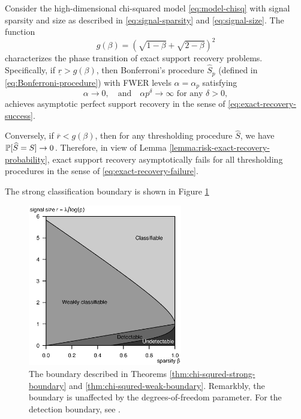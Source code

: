 \begin{theorem} \label{thm:chi-squred-strong-boundary}
Consider the high-dimensional chi-squared model \eqref{eq:model-chisq} with signal sparsity and size as described in \eqref{eq:signal-sparsity} and \eqref{eq:signal-size}.
The function 
\begin{equation} \label{eq:strong-classification-boundary-chisquared}
    g(\beta) = \left(\sqrt{1-\beta} + \sqrt{2-\beta}\right)^2
\end{equation}
characterizes the phase transition of exact support recovery problems.
Specifically, if $\underline{r} > {{g}}(\beta)$, then Bonferroni's procedure $\widehat{S}_p$ (defined in \eqref{eq:Bonferroni-procedure}) with FWER levels $\alpha=\alpha_p$ satisfying
\begin{equation} \label{eq:FWER-rate-to-zero}
    \alpha\to 0,\quad \text{and} \quad \alpha p^\delta\to\infty \text{  for any } \delta>0,
\end{equation}
achieves asymptotic perfect support recovery in the sense of \eqref{eq:exact-recovery-success}. 

Conversely, if $\overline{r} < {{g}}(\beta)$, then for any thresholding procedure $\widehat{S}$, we have $\P[\widehat{S}=S]\to0$.
Therefore, in view of Lemma \ref{lemma:risk-exact-recovery-probability}, exact support recovery asymptotically fails for all thresholding procedures in the sense of \eqref{eq:exact-recovery-failure}.
\end{theorem}

The strong classification boundary is shown in Figure \ref{fig:phase-chi-squared}

\begin{figure}
      \centering
      \includegraphics[width=0.6\textwidth]{./phase_diagram_chisquared.eps}
      \caption{The boundary described in Theorems \ref{thm:chi-squred-strong-boundary} and \ref{thm:chi-squred-weak-boundary}. 
      Remarkbly, the boundary is unaffected by the degrees-of-freedom parameter.
      For the detection boundary, see \citep{donoho2004higher}.} 
      \label{fig:phase-chi-squared}
\end{figure}

